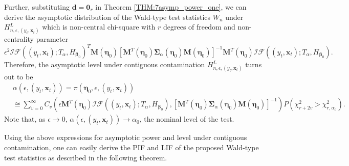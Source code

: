 \documentclass[a4paper]{article}%
\newtheorem{corollary}[theorem]{Corollary}
\begin{document}
Further, substituting $\boldsymbol{d}=\boldsymbol{0}_{r}$ in Theorem
\ref{THM:7asymp_power_one}, we can derive the asymptotic distribution of the
Wald-type test statistics $W_{n}$ under $H_{n,\epsilon,(y_{t},\boldsymbol{x}%
_{t})}^{L}$ which is non-central chi-square with $r$ degrees of freedom and
non-centrality parameter
\[
\epsilon^{2}\mathcal{IF}((y_{t},\boldsymbol{x}_{t});T_{\alpha}%
,H_{\boldsymbol{\beta}_{0}})^{T} \boldsymbol{M}\left(  \boldsymbol{\eta}%
_{0}\right)  \left[  \boldsymbol{M}^{T}\left(  \boldsymbol{\eta}_{0}\right)
\boldsymbol{\Sigma}_{\alpha}\left(  \boldsymbol{\eta}_{0}\right)
\boldsymbol{M}\left(  \boldsymbol{\eta}_{0}\right)  \right]  ^{-1}
\boldsymbol{M}^{T}\left(  \boldsymbol{\eta}_{0}\right)  \mathcal{IF}%
((y_{t},\boldsymbol{x}_{t});T_{\alpha},H_{\boldsymbol{\beta}_{0}}).
\]
Therefore, the asymptotic level under contiguous contamination $H_{n,\epsilon
,(y_{t},\boldsymbol{x}_{t})}^{L}$ turns out to be
\begin{align}
&  \alpha(\epsilon,(y_{t},\boldsymbol{x}_{t})) =\pi(\boldsymbol{\eta}%
_{0},\epsilon,(y_{t},\boldsymbol{x}_{t}))\nonumber\\
&  \cong\sum\limits_{v=0}^{\infty}C_{v}\left(  \epsilon\boldsymbol{M}%
^{T}\left(  \boldsymbol{\eta}_{0}\right) \mathcal{IF}((y_{t},\boldsymbol{x}%
_{t});T_{\alpha},H_{\boldsymbol{\beta}_{0}}), \left[  \boldsymbol{M}%
^{T}\left(  \boldsymbol{\eta}_{0}\right) \boldsymbol{\Sigma}_{\alpha}\left(
\boldsymbol{\eta}_{0}\right)  \boldsymbol{M}\left(  \boldsymbol{\eta}%
_{0}\right)  \right]  ^{-1}\right)  P\left(  \chi_{r+2v}^{2}>\chi_{r,\alpha_0
}^{2}\right)  .\nonumber
\end{align}
Note that, as $\epsilon\rightarrow0$, $\alpha(\epsilon,(y_{t},\boldsymbol{x}%
_{t})) \rightarrow\alpha_{0}$, the nominal level of the test.


Using the above expressions for asymptotic power and level under contiguous
contamination, one can easily derive the PIF and LIF of the proposed Wald-type
test statistics as described in the following theorem.
\end{document}

